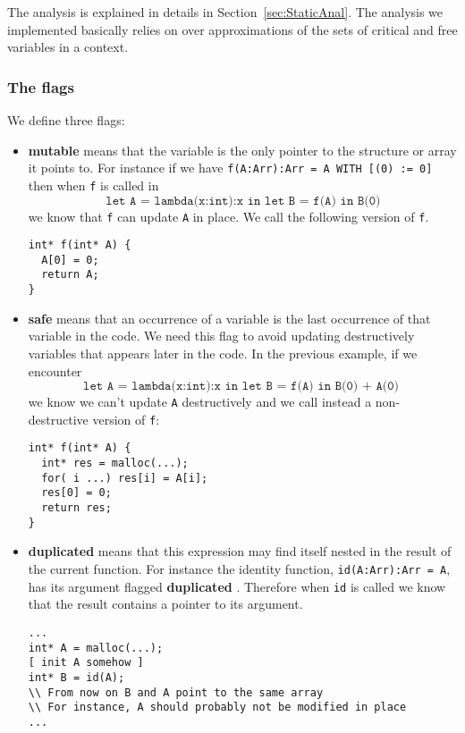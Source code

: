 \documentclass[12pt,a4paper]{article}
\newcommand{\cl}[1]{\texttt{#1}}
\newcommand{\bang}{ \textbf{ mutable } }
\newcommand{\safe}{ \textbf{ safe } }
\newcommand{\dupl}{ \textbf{ duplicated } }
\begin{document}
The analysis is explained in details in Section~\ref{sec:StaticAnal}. The analysis we implemented basically relies on over approximations of the sets of critical and free variables in a context.

\subsubsection*{The flags}

We define three flags:
\begin{itemize}
\item \bang means that the variable is the only pointer to the structure or array it points to. For instance if we have \cl{f(A:Arr):Arr = A WITH [(0) := 0]} then when \cl{f} is called in
$$ \cl{let A = lambda(x:int):x in let B = f(A) in B(0)} $$
we know that \cl{f} can update \cl{A} in place. We call the following version of \cl{f}.
\begin{lstlisting}
int* f(int* A) {
  A[0] = 0;
  return A;
}
\end{lstlisting}

\item \safe means that an occurrence of a variable is the last occurrence of that variable in the code. We need this flag to avoid updating destructively variables that appears later in the code. In the previous example, if we encounter
$$ \cl{let A = lambda(x:int):x in let B = f(A) in B(0) + A(0) }$$
we know we can't update \cl{A} destructively and we call instead a non-destructive version of \cl{f}:
\begin{lstlisting}
int* f(int* A) {
  int* res = malloc(...);
  for( i ...) res[i] = A[i];
  res[0] = 0;
  return res;
}
\end{lstlisting}

\item \dupl means that this expression may find itself nested in the result of the current function. For instance the identity function, \cl{id(A:Arr):Arr = A}, has its argument flagged \dupl. Therefore when \cl{id} is called we know that the result contains a pointer to its argument.
\begin{lstlisting}
...
int* A = malloc(...);
[ init A somehow ]
int* B = id(A);
\\ From now on B and A point to the same array
\\ For instance, A should probably not be modified in place
...
\end{lstlisting}
\end{itemize}
\end{document}
